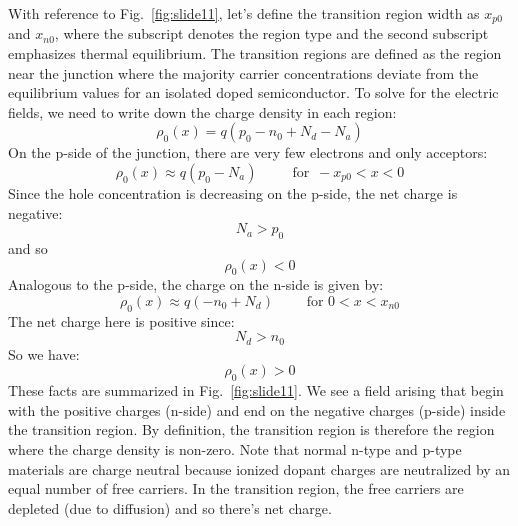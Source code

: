 With reference to Fig.~\ref{fig:slide11}, let's define the transition region width as $x_{p0}$ and $x_{n0}$, where the subscript denotes the region type and the second subscript emphasizes thermal equilibrium.   The transition regions are defined as the region near the junction where the majority carrier concentrations deviate from the equilibrium values for an isolated doped semiconductor.    To solve for the electric fields, we need to write down the charge density in each region:
%
\begin{equation} 
	{\rho _0}(x) = q({p_0} - {n_0} + {N_d} - {N_a}) 
\end{equation}
%
On the p-side of the junction, there are very few electrons and only acceptors:
%
\begin{equation} 
	{\rho _0}(x) \approx q({p_0} - {N_a}) \,\,\,\quad\quad \text{for}\,\,\,  - {x_{p0}} < x < 0 
\end{equation}
% 
Since the hole concentration is decreasing on the p-side, the net charge is negative:
\begin{equation} 
	{N_a} > {p_0} 
\end{equation}
and so
\begin{equation}
	 {\rho _0}(x) < 0 
\end{equation}
Analogous to the p-side, the charge on the n-side is given by:
%
\begin{equation} 
	{\rho _0}(x) \approx q( - {n_0} + {N_d}) \,\,\quad\quad\text{for}\,\, 0 < x < {x_{n0}}
\end{equation}
% 
The net charge here is positive since:
\begin{equation} 
	{N_d} > {n_0} 
\end{equation}
So we have:
\begin{equation} 
	{\rho _0}(x) > 0 
\end{equation}
These facts are summarized in Fig.~\ref{fig:slide11}.  We see a field arising that begin with the positive charges (n-side) and end on the negative charges (p-side) inside the transition region.  By definition, the transition region is therefore the region where the charge density is non-zero.  Note that normal n-type and p-type materials are charge neutral because ionized dopant charges are neutralized by an equal number of free carriers.  In the transition region, the free carriers are depleted (due to diffusion) and so there's net charge.   




